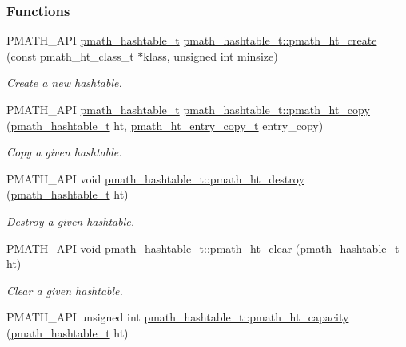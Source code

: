 \subsubsection*{Functions}
\begin{CompactItemize}
\item 
PMATH\_\-API \hyperlink{classpmath__hashtable__t}{pmath\_\-hashtable\_\-t} \hyperlink{group__hashtables_g6835e6b0d0b308ef15f4f885298078f5}{pmath\_\-hashtable\_\-t::pmath\_\-ht\_\-create} (const pmath\_\-ht\_\-class\_\-t $\ast$klass, unsigned int minsize)
\begin{CompactList}\small\item\em Create a new hashtable. \item\end{CompactList}\item 
PMATH\_\-API \hyperlink{classpmath__hashtable__t}{pmath\_\-hashtable\_\-t} \hyperlink{group__hashtables_gf82265c2aff9bb75eb7beb057a812aa3}{pmath\_\-hashtable\_\-t::pmath\_\-ht\_\-copy} (\hyperlink{classpmath__hashtable__t}{pmath\_\-hashtable\_\-t} ht, \hyperlink{group__hashtables_g7afcd0897350cdf6ea146196421d70f1}{pmath\_\-ht\_\-entry\_\-copy\_\-t} entry\_\-copy)
\begin{CompactList}\small\item\em Copy a given hashtable. \item\end{CompactList}\item 
PMATH\_\-API void \hyperlink{group__hashtables_g48cbf069ed0fa62b2e95ec196aceff16}{pmath\_\-hashtable\_\-t::pmath\_\-ht\_\-destroy} (\hyperlink{classpmath__hashtable__t}{pmath\_\-hashtable\_\-t} ht)
\begin{CompactList}\small\item\em Destroy a given hashtable. \item\end{CompactList}\item 
PMATH\_\-API void \hyperlink{group__hashtables_gba9a2535237d8482482a338bafa2d5f1}{pmath\_\-hashtable\_\-t::pmath\_\-ht\_\-clear} (\hyperlink{classpmath__hashtable__t}{pmath\_\-hashtable\_\-t} ht)
\begin{CompactList}\small\item\em Clear a given hashtable. \item\end{CompactList}\item 
PMATH\_\-API unsigned int \hyperlink{group__hashtables_gc3bb123d747694b6144b8561efb15feb}{pmath\_\-hashtable\_\-t::pmath\_\-ht\_\-capacity} (\hyperlink{classpmath__hashtable__t}{pmath\_\-hashtable\_\-t} ht)

\end{CompactItemize}
